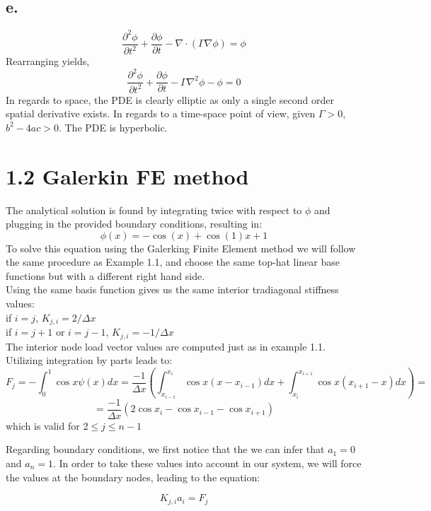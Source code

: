 \documentclass[11pt]{article}
\begin{document}
\subsection{\textbf{e.}}
\label{sec-1-5}
\[
\frac{\partial^{2} \phi}{\partial t^{2}} + \frac{\partial \phi}{\partial t} - \nabla \cdot \left(\Gamma \nabla \phi \right) = \phi
\]
Rearranging yields,
\[
\frac{\partial^{2} \phi}{\partial t^{2}} + \frac{\partial \phi}{\partial t} - \Gamma \nabla^{2} \phi - \phi = 0
\]
In regards to space, the PDE is clearly elliptic as only a single second order spatial derivative exists. In regards to a time-space point of view, given $\Gamma > 0$,  $b^{2} -4ac > 0$. The PDE is hyperbolic.
\newpage
\section{1.2 Galerkin FE method}
\label{sec-2}
The analytical solution is found by integrating twice with respect to $\phi$ and plugging in the provided boundary conditions, resulting in:
\[
\phi(x) = -\cos(x) +  \cos(1) x +1
\]
To solve this equation using the Galerking Finite Element method we will follow the same procedure as Example 1.1, and choose the same top-hat linear base functions but with a different right hand side.\\
Using the same basis function gives us the same interior tradiagonal stiffness values: \\
if $i=j$, $K_{j,i} = 2 / \Delta x$ \\
if $i = j+1$ or $i = j-1$, $K_{j,i} = -1 / \Delta x$ \\
The interior node load vector values are computed just as in example 1.1. Utilizing integration by parts leads to:
\[
F_{j}=-\int_{0}^{1} \cos x \psi(x)dx = \frac{-1}{\Delta x} \left(\int_{x_{i-1}}^{x_{i}} \cos x \left(x -x_{i-1} \right)dx + \int_{x_{i}}^{x_{i+1}} \cos x \left(x_{i+1} -x \right)dx \right) =
\]
\[
= \frac{-1}{\Delta x} \left( 2\cos x_{i}  - \cos x_{i-1}  - \cos x_{i+1}\right)
\] 
which is valid for $2 \leq j \leq n-1$

Regarding boundary conditions, we first notice that the we can infer that $a_{1}=0$ and $a_{n}=1$.
In order to take these values into account in our system, we will force the values at the boundary nodes, leading to the equation: 

\[
K_{j,i}a_{i}=F_{j}
\]
\end{document}
